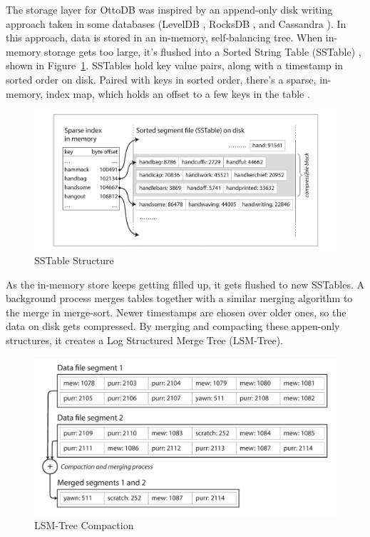 \documentclass[conference]{IEEEtran}
\begin{document}
    The storage layer for OttoDB was inspired by an append-only disk writing approach taken in some databases (LevelDB \cite{b7}, RocksDB \cite{b6}, and Cassandra \cite{b19}). In this approach, data is stored in an in-memory, self-balancing tree. When in-memory storage gets too large, it's flushed into a Sorted String Table (SSTable) \cite[p. 78]{b18}, shown in Figure~\ref{fig:SSTable}. SSTables hold key value pairs, along with a timestamp in sorted order on disk. Paired with keys in sorted order, there's a sparse, in-memory, index map, which holds an offset to a few keys in the table \cite[p. 77]{b18}. 

    \begin{figure}[h]
        \centering
        \includegraphics[width=\columnwidth]{figures/SSTable.png}
        \caption{SSTable Structure}
        \label{fig:SSTable}
        \end{figure}

    As the in-memory store keeps getting filled up, it gets flushed to new SSTables. A background process merges tables together with a similar merging algorithm to the merge in merge-sort. Newer timestamps are chosen over older ones, so the data on disk gets compressed. By merging and compacting these appen-only structures, it creates a Log Structured Merge Tree (LSM-Tree). 

    \begin{figure}[h]
        \centering
        \includegraphics[width=\columnwidth]{figures/LSMTree.png}
        \caption{LSM-Tree Compaction}
        \label{fig:LSMTree}
        \end{figure}
\end{document}
